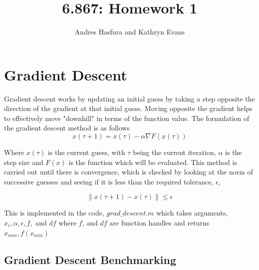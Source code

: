 \documentclass{article}
\begin{document}
\title{6.867: Homework 1}
\author{Andres Hasfura and Kathryn Evans}
\maketitle
\section{Gradient Descent}
Gradient descent works by updating an initial guess by taking a step opposite the direction of the gradient at that initial guess. Moving opposite the gradient helps  to effectively move "downhill" in terms of the function value.  The formulation of the gradient descent method is as follows
\begin{equation}
x(\tau+1) = x(\tau) - \alpha \nabla F(x(\tau))
\end{equation}

Where $ x(\tau)$ is the current guess, with $\tau$ being the current iteration, $\alpha$ is the step size and $F(x)$ is the function which will be evaluated. This method is carried out until there is convergence, which is checked by looking at the norm of successive guesses and seeing if it is less than the required tolerance, $\epsilon$,   



\begin{equation} 
\left \lVert x(\tau+1)-x(\tau) \right \rVert \leq \epsilon
\end{equation}

This is implemented in the code, $grad\_descent.m$ which takes arguments, $x_i, \alpha, \epsilon, f,$ and $df$ where $f$, and $df$ are function handles and returns $x_{min}, f(x_{min})$



\subsection*{ Gradient Descent Benchmarking}
\end{document}
